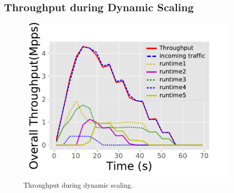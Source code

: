 
\subsection{Throughput during Dynamic Scaling}

\begin{figure}[!t]
	\centering
	\includegraphics[width=\columnwidth]{figure/Scale.pdf}
	\caption{Throughput during dynamic scaling.}
\label{fig:normal-case-scale}
\end{figure}


